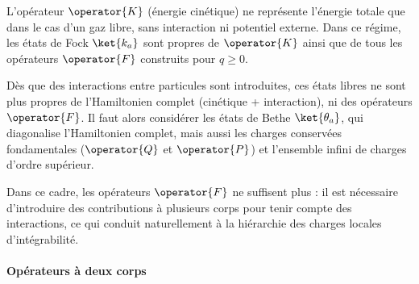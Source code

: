 \begin{mdframed}
%
%
%
%

L’opérateur $\operator{K}$ (énergie cinétique) ne représente l’énergie totale que dans le cas d’un gaz libre, sans interaction ni potentiel externe. Dans ce régime, les états de Fock $\ket{{k_a}}$ sont propres de $\operator{K}$ ainsi que de tous les opérateurs $\operator{F}$ construits pour $q \geq 0$.

\medskip

Dès que des interactions entre particules sont introduites, ces états libres ne sont plus propres de l’Hamiltonien complet (cinétique + interaction), ni des opérateurs $\operator{F}$. Il faut alors considérer les états de Bethe $\ket{{\theta_a}}$, qui diagonalise l’Hamiltonien complet, mais aussi les charges conservées fondamentales ($\operator{Q}$ et $\operator{P}$) et l’ensemble infini de charges d’ordre supérieur.

\medskip

Dans ce cadre, les opérateurs $\operator{F}$ ne suffisent plus : il est nécessaire d’introduire des contributions à plusieurs corps pour tenir compte des interactions, ce qui conduit naturellement à la hiérarchie des charges locales d’intégrabilité.

\end{mdframed}



\paragraph{Opérateurs à deux corps}

